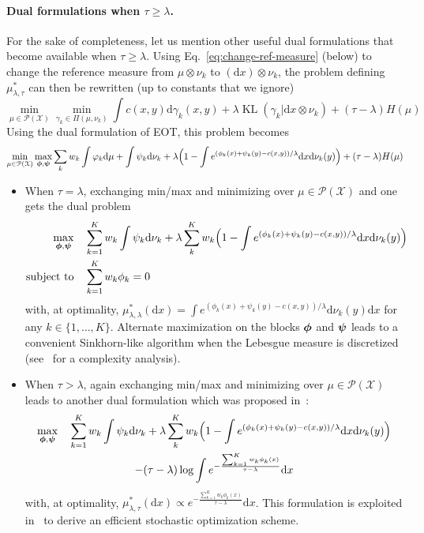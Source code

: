 \documentclass[11pt]{article}
\newcommand{\rev}[1]{{#1}}
\newcommand{\Pp}{\mathcal{P}}
\newcommand{\Xx}{\mathcal{X}}
\renewcommand{\d}{\mathrm{d}}
\DeclareMathOperator{\KL}{KL}
\begin{document}
\rev{\paragraph{Dual formulations when $\tau\geq \lambda$.} For the sake of completeness, let us mention other useful dual formulations that become available when $\tau\geq \lambda$. Using Eq.~\eqref{eq:change-ref-measure} (below) to change the reference measure from $\mu\otimes \nu_k$ to $(\d x)\otimes \nu_k$, the problem defining $\mu^*_{\lambda,\tau}$ can then be rewritten (up to constants that we ignore)
$$
\min_{\mu \in \Pp(\Xx)} \min_{\gamma_k\in \Pi(\mu,\nu_k)} \int c(x,y)\d\gamma_k(x,y)+\lambda \KL(\gamma_k|\d x \otimes \nu_k) + (\tau-\lambda)H(\mu)
$$
Using the dual formulation of EOT, this problem becomes
$$
\min_{\mu \in \Pp(\Xx)} \max_{\bphi,\bpsi} \sum_k w_k \int \varphi_k\d\mu +\int \psi_k \d\nu_k +\lambda \Big( 1-\int e^{(\phi_k(x)+\psi_k(y)-c(x,y))/\lambda}\d x \d\nu_k(y) \Big) + (\tau-\lambda) H(\mu)
$$

\begin{itemize}
\item  When $\tau=\lambda$, exchanging min/max and minimizing over $\mu\in \Pp(\Xx)$ and one gets the dual problem~\cite[Prop.~9.1]{peyre2019computational}
\begin{align*}
\max_{\bphi,\bpsi} &\quad \sum_{k=1}^K w_k  \int \psi_k\d\nu_k + \lambda \sum_{k}^K w_k \Big( 1-\int e^{(\phi_k(x)+\psi_k(y)-c(x,y))/\lambda}\d x \d \nu_k(y)  \Big)\\ \text{subject to} &\quad \sum_{k=1}^K w_k \phi_k=0
\end{align*}
with, at optimality, $\mu^*_{\lambda,\lambda}(\d x) = \int e^{(\phi_k(x)+\psi_k(y)-c(x,y))/\lambda} \d \nu_k(y)\d x$ for any $k\in \{1,\dots,K\}$. Alternate maximization on the blocks ${\boldsymbol{\phi}}$ and ${\boldsymbol{\psi}}$ leads to a convenient Sinkhorn-like algorithm when the Lebesgue measure is discretized (see~\cite{kroshnin2019complexity} for a complexity analysis).
\item When $\tau> \lambda$, again exchanging min/max and minimizing over $\mu\in \Pp(\Xx)$ leads to another dual formulation which was proposed in~\cite[Prop.~3.2]{ballu2020stochastic}:
\begin{multline*}
\max_{\bphi,\bpsi} \quad \sum_{k=1}^K w_k  \int \psi_k\d\nu_k + \lambda \sum_{k}^K w_k \Big( 1-\int e^{(\phi_k(x)+\psi_k(y)-c(x,y))/\lambda}\d x \d \nu_k(y)  \Big)\\
-(\tau-\lambda)\log \int e^{-\frac{\sum_{k=1}^K w_k \phi_k(x)}{\tau-\lambda}}\d x
\end{multline*}
with, at optimality, $\mu^*_{\lambda,\tau}(\d x) \propto e^{-\frac{\sum_{k=1}^K w_k \phi_k(x)}{\tau-\lambda}}\d x$. This formulation is exploited in~\cite{ballu2020stochastic} to derive an efficient stochastic optimization scheme.
\end{itemize}
} 
\end{document}

